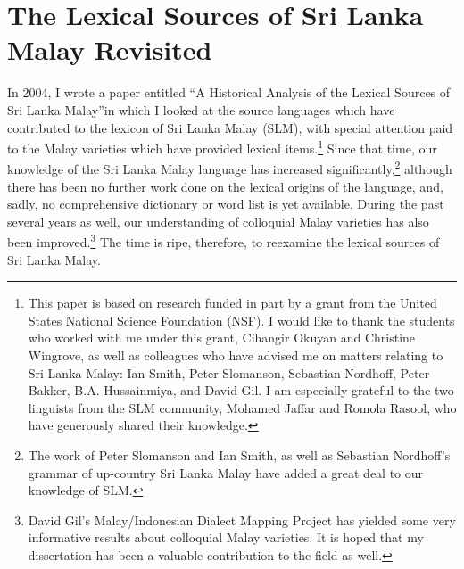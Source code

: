 \chapter[The Lexical Sources of SLM]{The Lexical Sources of Sri Lanka Malay Revisited}


In 2004, I wrote a paper entitled ``A Historical Analysis of the Lexical Sources of Sri Lanka Malay''in which I looked at the source languages which have contributed to the lexicon of Sri Lanka Malay (SLM), with special attention paid to the Malay varieties which have provided lexical items.\footnote{This
 paper is based on research funded in part by a grant from the United States National Science Foundation (NSF). I would like to thank the students who worked with me under this grant, Cihangir Okuyan and Christine Wingrove, as well as colleagues who have advised me on matters relating to Sri Lanka Malay: Ian Smith, Peter Slomanson, Sebastian Nordhoff, Peter Bakker,  B.A. Hussainmiya, and David Gil. I am especially grateful to the two linguists from the SLM community, Mohamed Jaffar and Romola Rasool, who have generously shared their knowledge.
} 
Since that time, our knowledge of the Sri Lanka Malay language has increased significantly,\footnote{The
 work of Peter Slomanson and Ian Smith, as well as Sebastian Nordhoff's grammar of up-country Sri Lanka Malay \citep{Nordhoff2009} have added a great deal to our knowledge of SLM. 
}
although there has been no further work done on the lexical origins of the language, and, sadly, no comprehensive dictionary or word list is yet available. During the past several years as well, our understanding of colloquial Malay varieties has also been improved.\footnote{David
 Gil's Malay/Indonesian Dialect Mapping Project has yielded some very informative results about colloquial Malay varieties. It is hoped that my dissertation \citep{Paauw2008} has been a valuable contribution to the field as well. 
}
The time is ripe, therefore, to reexamine the lexical sources of Sri Lanka Malay.

